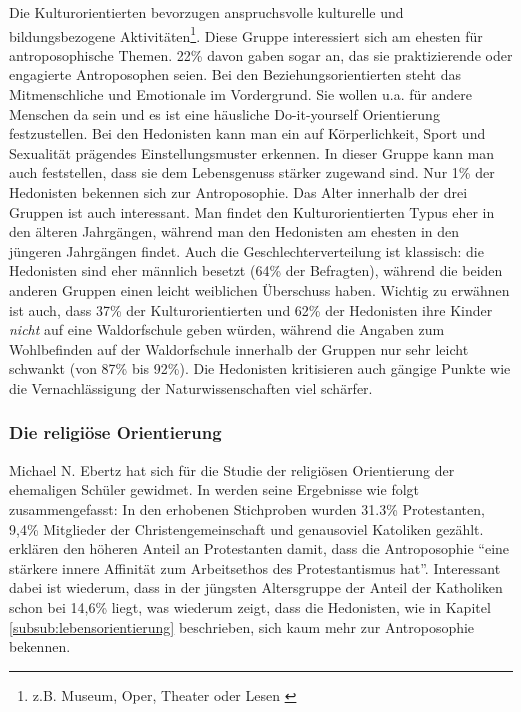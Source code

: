 Die Kulturorientierten bevorzugen anspruchsvolle kulturelle und bildungsbezogene Aktivitäten\footnote{z.B. Museum, Oper, Theater oder Lesen \citep[Vgl.][S. 17]{randoll07}}. 
Diese Gruppe interessiert sich am ehesten für antroposophische Themen. 
22\% davon gaben sogar an, das sie praktizierende oder engagierte Antroposophen seien. 
Bei den Beziehungsorientierten steht das Mitmenschliche und Emotionale im Vordergrund. 
Sie wollen u.a. für andere Menschen da sein und es ist eine häusliche Do-it-yourself Orientierung festzustellen. 
Bei den Hedonisten kann man ein auf Körperlichkeit, Sport und Sexualität prägendes Einstellungsmuster erkennen. 
In dieser Gruppe kann man auch feststellen, dass sie dem Lebensgenuss stärker zugewand sind. 
Nur 1\% der Hedonisten bekennen sich zur Antroposophie. 
Das Alter innerhalb der drei Gruppen ist auch interessant. 
Man findet den Kulturorientierten Typus eher in den älteren Jahrgängen, während man den Hedonisten am ehesten in den jüngeren Jahrgängen findet. 
Auch die Geschlechterverteilung ist klassisch: die Hedonisten sind eher männlich besetzt (64\% der Befragten), während die beiden anderen Gruppen einen leicht weiblichen Überschuss haben. 
Wichtig zu erwähnen ist auch, dass 37\% der Kulturorientierten und 62\% der Hedonisten ihre Kinder \emph{nicht} auf eine Waldorfschule geben würden, während die Angaben zum Wohlbefinden auf der Waldorfschule innerhalb der Gruppen nur sehr leicht schwankt (von 87\% bis 92\%). 
Die Hedonisten kritisieren auch gängige Punkte wie die Vernachlässigung der Naturwissenschaften viel schärfer. 

\subsubsection{Die religiöse Orientierung}

Michael N. Ebertz hat sich für die Studie der religiösen Orientierung der ehemaligen Schüler gewidmet. 
In \citet[][S. 18f]{randoll07} werden seine Ergebnisse wie folgt zusammengefasst: In den erhobenen Stichproben wurden 31.3\% Protestanten, 9,4\% Mitglieder der Christengemeinschaft und genausoviel Katoliken gezählt. 
\citet[][S. 18]{randoll07} erklären den höheren Anteil an Protestanten damit, dass die Antroposophie \enquote{eine stärkere innere Affinität zum Arbeitsethos des Protestantismus hat}. 
Interessant dabei ist wiederum, dass in der jüngsten Altersgruppe der Anteil der Katholiken schon bei 14,6\% liegt, was wiederum zeigt, dass die Hedonisten, wie in Kapitel \ref{subsub:lebensorientierung} beschrieben, sich kaum mehr zur Antroposophie bekennen. 

